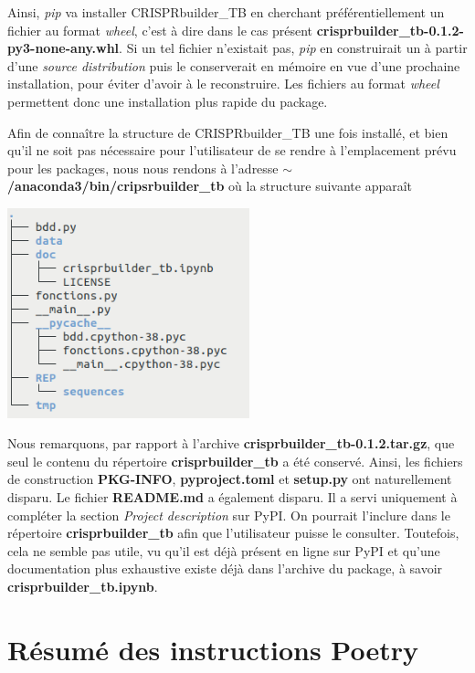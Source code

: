 \documentclass[twoside,a4paper,11pt,frenchb,openany]{report}
\begin{document}
Ainsi, \textit{pip} va installer CRISPRbuilder\_TB en cherchant préférentiellement un fichier au format \textit{wheel}, c'est à dire dans le cas présent \textbf{crisprbuilder\_tb-0.1.2-py3-none-any.whl}. Si un tel fichier n'existait pas, \textit{pip} en construirait un à partir d'une \textit{source distribution} puis le conserverait en mémoire en vue d'une prochaine installation, pour éviter d'avoir à le reconstruire. Les fichiers au format \textit{wheel} permettent donc une installation plus rapide du package.

Afin de connaître la structure de CRISPRbuilder\_TB une fois installé, et bien qu'il ne soit pas nécessaire pour l'utilisateur de se rendre à l'emplacement prévu pour les packages, nous nous rendons à l'adresse \textbf{$\sim$/anaconda3/bin/cripsrbuilder\_tb} où la structure suivante apparaît

\includegraphics[width=7cm]{crispr_installe.png}

Nous remarquons, par rapport à l'archive \textbf{crisprbuilder\_tb-0.1.2.tar.gz}, que seul le contenu du répertoire \textbf{crisprbuilder\_tb} a été conservé. Ainsi, les fichiers de construction \textbf{PKG-INFO}, \textbf{pyproject.toml} et \textbf{setup.py} ont naturellement disparu. Le fichier \textbf{README.md} a également disparu. Il a servi uniquement à compléter la section \textit{Project description} sur PyPI. On pourrait l'inclure dans le répertoire \textbf{crisprbuilder\_tb} afin que l'utilisateur puisse le consulter. Toutefois, cela ne semble pas utile, vu qu'il est déjà présent en ligne sur PyPI et qu'une documentation plus exhaustive existe déjà dans l'archive du package, à savoir \textbf{crisprbuilder\_tb.ipynb}.




\section{Résumé des instructions Poetry}
\end{document}
